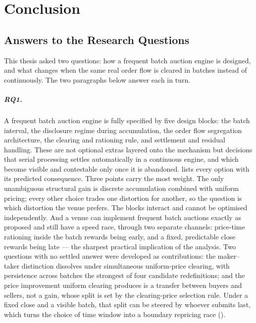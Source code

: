\chapter{Conclusion}
\label{ch:conclusion}

\section{Answers to the Research Questions}

This thesis asked two questions: how a frequent batch auction engine is
designed, and what changes when the same real order flow is cleared in
batches instead of continuously. The two paragraphs below answer each in
turn.

\paragraph{RQ1.} A frequent batch auction engine is fully specified by five
design blocks: the batch interval, the disclosure regime during
accumulation, the order flow segregation architecture, the clearing and
rationing rule, and settlement and residual handling. These are not
optional extras layered onto the mechanism but decisions that serial
processing settles automatically in a continuous engine, and which become
visible and contestable only once it is abandoned. 
lists every option with its predicted consequence. Three points carry the
most weight. The only unambiguous structural gain is discrete accumulation
combined with uniform pricing; every other choice trades one distortion for
another, so the question is which distortion the venue prefers. The blocks
interact and cannot be optimised independently. And a venue can implement
frequent batch auctions exactly as proposed and still have a speed race,
through two separate channels: price-time rationing inside the batch
rewards being early, and a fixed, predictable close rewards being late ---
the sharpest practical implication of the analysis.
Two questions with no settled answer were developed as contributions: the
maker--taker distinction dissolves under simultaneous uniform-price
clearing, with persistence across batches the strongest of four candidate
redefinitions; and the price improvement uniform clearing produces is a
transfer between buyers and sellers, not a gain, whose split is set by the
clearing-price selection rule. Under a fixed close and a visible batch,
that split can be steered by whoever submits last, which turns the choice
of time window into a boundary repricing race ().

